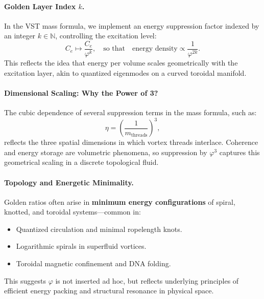 \documentclass[11pt]{article}
\begin{document}
    \paragraph{Golden Layer Index \( k \).}
    In the VST mass formula, we implement an energy suppression factor indexed by an integer \( k \in \mathbb{N} \), controlling the excitation level:
    \begin{equation}
        C_e \longmapsto \frac{C_e}{\varphi^k}, \quad \text{so that} \quad \text{energy density} \propto \frac{1}{\varphi^{2k}}.
    \end{equation}
    This reflects the idea that energy per volume scales geometrically with the excitation layer, akin to quantized eigenmodes on a curved toroidal manifold.

    \paragraph{Dimensional Scaling: Why the Power of 3?}
    The cubic dependence of several suppression terms in the mass formula, such as:
    \begin{equation}
        \eta = \left( \frac{1}{m_{\text{threads}}} \right)^3,
    \end{equation}
    reflects the three spatial dimensions in which vortex threads interlace. Coherence and energy storage are volumetric phenomena, so suppression by \( \varphi^3 \) captures this geometrical scaling in a discrete topological fluid.

    \paragraph{Topology and Energetic Minimality.}
    Golden ratios often arise in \textbf{minimum energy configurations} of spiral, knotted, and toroidal systems—common in:
    \begin{itemize}
        \item Quantized circulation and minimal ropelength knots.
        \item Logarithmic spirals in superfluid vortices.
        \item Toroidal magnetic confinement and DNA folding.
    \end{itemize}
    This suggests \( \varphi \) is not inserted ad hoc, but reflects underlying principles of efficient energy packing and structural resonance in physical space.
\end{document}

